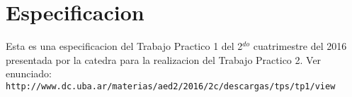 \documentclass[10pt, a4paper]{article}
\begin{document}
{} %


\maketitle

\tableofcontents

\pagebreak


\section{Especificacion}
Esta es una especificacion del Trabajo Practico 1 del 2$^{do}$ cuatrimestre del 2016 presentada por la catedra para la realizacion del Trabajo Practico 2. Ver enunciado:\\
\verb+http://www.dc.uba.ar/materias/aed2/2016/2c/descargas/tps/tp1/view+\\


\newpage

\newpage

%
%
\end{document}
